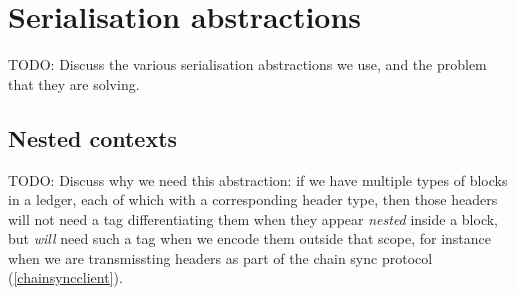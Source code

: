 \section{Serialisation abstractions}

TODO: Discuss the various serialisation abstractions we use, and the problem that
they are solving.

\subsection{Nested contexts}
\label{storage:nested-contexts}

TODO: Discuss why we need this abstraction: if we have multiple types of blocks
in a ledger, each of which with a corresponding header type, then those headers
will not need a tag differentiating them when they appear \emph{nested} inside
a block, but \emph{will} need such a tag when we encode them outside that scope,
for instance when we are transmissting headers as part of the chain sync
protocol (\cref{chainsyncclient}).
